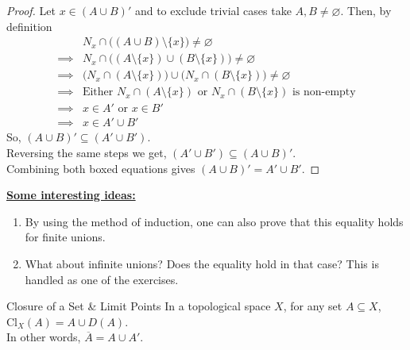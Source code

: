 \begin{proof}
    Let $x\in (A\cup B)'$ and to exclude trivial cases take $A, B\neq\varnothing$. Then, by definition
    \begin{align*}
        &N_x\cap\big((A\cup B)\setminus\{x\}\big)\neq\varnothing\\
        \implies&N_x\cap\big((A\setminus\{x\})\cup (B\setminus\{x\})\big)\neq\varnothing\\
        \implies&\big(N_x\cap(A\setminus\{x\})\big)\cup\big(N_x\cap(B\setminus\{x\})\big)\neq\varnothing\\
        \implies&\text{Either }N_x\cap(A\setminus\{x\})\text{ or } N_x\cap(B\setminus\{x\})\text{ is non-empty}\\
        \implies&x\in A'\text{ or }x\in B'\\
        \implies&x\in A'\cup B'
    \end{align*}
    So, $\boxed{(A\cup B)'\subseteq (A'\cup B')}$.\\
    Reversing the same steps we get, $\boxed{(A'\cup B')\subseteq(A\cup B)'}$.\\
    Combining both boxed equations gives $(A\cup B)'=A'\cup B'$.
\end{proof}
\noindent\textbf{\underline{Some interesting ideas:}}
\begin{enumerate}
    \item By using the method of induction, one can also prove that this equality holds for finite unions.
    \item What about infinite unions? Does the equality hold in that case? This is handled as one of the exercises.
\end{enumerate}
\begin{Theorem}{Closure of a Set \& Limit Points}\label{closure_limit_points}
    In a topological space $X$, for any set $A\subseteq X$, $\mathrm{Cl}_X(A)=A\cup D(A)$.\\
    In other words, $\overline{A}=A\cup A'$.
\end{Theorem}
